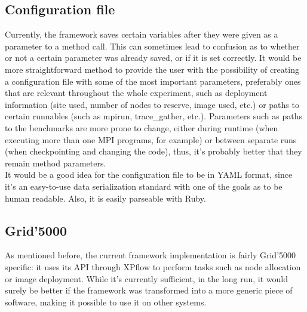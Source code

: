 \subsection{Configuration file}
Currently, the framework saves certain variables after they were given
as a parameter to a method call. This can sometimes lead to confusion
as to whether or not a certain parameter was already saved, or if it
is set
correctly. It would be more straightforward method to provide the user
with the possibility of creating a configuration file with some of the
most important parameters, preferably ones that are relevant
throughout the whole experiment, such as deployment information (site
used, number of nodes to reserve, image used, etc.) or paths to
certain runnables (such as mpirun, trace\_gather, etc.). Parameters
such as paths to the benchmarks are more prone to change, either
during runtime (when executing more than one MPI programs, for
example) or between separate runs (when checkpointing and changing the
code), thus, it's probably better that they remain method
parameters.\\[0.3cm]
It would be a good idea for the configuration file to be in
YAML\cite{ben09} format, since it's an easy-to-use data serialization
standard with one of the goals as to be human readable. Also, it is
easily parseable with Ruby.
\subsection{Grid'5000}
As mentioned before, the current framework implementation is fairly
Grid'5000 specific: it uses its API through XPflow to perform tasks
such as node allocation or image deployment. While it's currently
sufficient, in the long run, it would surely be better if the
framework was transformed into a more generic piece of software,
making it possible to use it on other systems.
